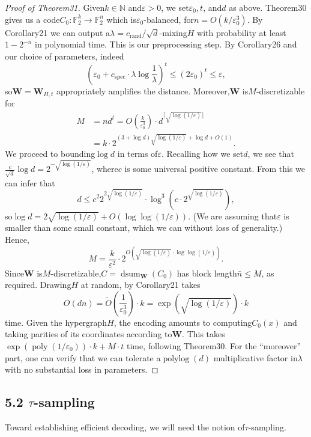 \documentclass[10pt,a4paper]{article}
\DeclareMathOperator{\dsum}{dsum}
\begin{document}
\begin{proof}[Proof of Theorem31]
Given$k\in\mathbb N$ and$\varepsilon>0$, we set$\varepsilon_0,t$, and$d$ as above. Theorem30 gives us a code$C_0:\mathbb F_2^k\to\mathbb F_2^n$ which is$\varepsilon_0$-balanced, for$n=O(k/\varepsilon_0^3)$. By Corollary21 we can output a$\lambda=c_{\mathrm{rand}}/\sqrt d$-mixing$H$ with probability at least$1-2^{-n}$ in polynomial time. This is our preprocessing step. By Corollary26 and our choice of parameters, indeed
\[\left(\varepsilon_0+c_{\mathrm{spec}}\cdot\lambda\log\frac1\lambda\right)^t\leq(2\varepsilon_0)^t\leq\varepsilon,\]
so$\mathbf W=\mathbf W_{H,t}$ appropriately amplifies the distance. Moreover,$\mathbf W$ is$M$-discretizable for
\begin{align*}
M&=nd^t=O\left(\frac k{\varepsilon_0^3}\right)\cdot d^{\lceil\sqrt{\log(1/\varepsilon)}\rceil}\\
&=k\cdot2^{(3+\log d)\sqrt{\log(1/\varepsilon)}+\log d+O(1)}.
\end{align*}
We proceed to bounding$\log d$ in terms of$\varepsilon$. Recalling how we set$d$, we see that$\frac c{\sqrt d}\log d=2^{-\sqrt{\log(1/\varepsilon)}}$, where$c$ is some universal positive constant. From this we can infer that
\[d\leq c^2 2^{2\sqrt{\log(1/\varepsilon)}}\cdot\log^3\left(c\cdot2^{\sqrt{\log(1/\varepsilon)}}\right),\tag{7}\]
so$\log d=2\sqrt{\log(1/\varepsilon)}+O(\log\log(1/\varepsilon))$. (We are assuming that$\varepsilon$ is smaller than some small constant, which we can without loss of generality.) Hence,
\[M=\frac k{\varepsilon^2}\cdot2^{O(\sqrt{\log(1/\varepsilon)}\cdot\log\log(1/\varepsilon))}.\]
Since$\mathbf W$ is$M$-discretizable,$C=\dsum_{\mathbf W}(C_0)$ has block length$\bar n\leq M$, as required. Drawing$H$ at random, by Corollary21 takes
\[O(dn)=\widetilde O\left(\frac1{\varepsilon_0^3}\right)\cdot k=\exp(\sqrt{\log(1/\varepsilon)})\cdot k\]
time. Given the hypergraph$H$, the encoding amounts to computing$C_0(x)$ and taking parities of its coordinates according to$\mathbf W$. This takes$\exp(\operatorname{poly}(1/\varepsilon_0))\cdot k+M\cdot t$ time, following Theorem30.
For the ``moreover'' part, one can verify that we can tolerate a$\operatorname{polylog}(d)$ multiplicative factor in$\lambda$ with no substantial loss in parameters.
\end{proof}

\subsection*{5.2 $\tau$-sampling}
Toward establishing efficient decoding, we will need the notion of$\tau$-sampling.
\end{document}
